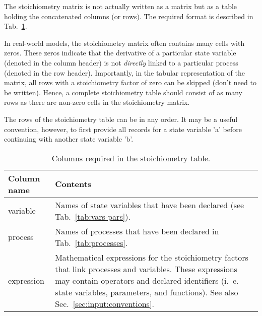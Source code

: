 \documentclass[a4paper]{article}
\begin{document}
The stoichiometry matrix is not actually written as a matrix but as a table holding the concatenated columns (or rows). The required format is described in  Tab.~\ref{tab:stoichiometry}.

In real-world models, the stoichiometry matrix often contains many cells with zeros. These zeros indicate that the derivative of a particular state variable (denoted in the column header) is not \emph{directly} linked to a particular process (denoted in the row header). Importantly, in the tabular representation of the matrix, all rows with a stoichiometry factor of zero can be skipped (don't need to be written). Hence, a complete stoichiometry table should consist of as many rows as there are non-zero cells in the stoichiometry matrix.

The rows of the stoichiometry table can be in any order. It may be a useful convention, however, to first provide all records for a state variable 'a' before continuing with another state variable 'b'.

\begin{table}[!h]
  \caption{Columns required in the stoichiometry table. \label{tab:stoichiometry}}
  \begin{tabular}{lp{}} \hline\hline
    \textbf{Column name} & \textbf{Contents} \\ \hline
    variable & Names of state variables that have been declared (see Tab.~\ref{tab:vars-pars}). \\
    process & Names of processes that have been declared in Tab.~\ref{tab:processes}. \\
    expression & Mathematical expressions for the stoichiometry factors that link processes and variables. These expressions may contain operators and declared identifiers (i.~e. state variables, parameters, and functions). See also Sec.~\ref{sec:input:conventions}. \\
    \hline
  \end{tabular}
\end{table}
\end{document}
